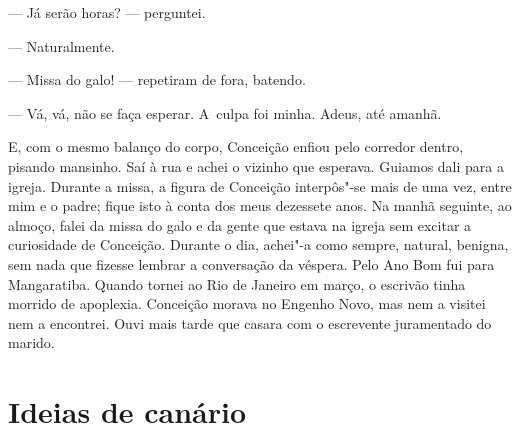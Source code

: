 \begin{linenumbers}
--- Já serão horas? --- perguntei.

--- Naturalmente.

--- Missa do galo! --- repetiram de fora, batendo.

--- Vá, vá, não se faça esperar. A~culpa foi minha. Adeus, até amanhã.

E, com o mesmo balanço do corpo, Conceição enfiou pelo corredor dentro,
pisando mansinho. Saí à rua e achei o vizinho que esperava. Guiamos dali
para a igreja. Durante a missa, a figura de Conceição interpôs"-se mais
de uma vez, entre mim e o padre; fique isto à conta dos meus dezessete
anos. Na manhã seguinte, ao almoço, falei da missa do galo e da gente
que estava na igreja sem excitar a curiosidade de Conceição. Durante o
dia, achei"-a como sempre, natural, benigna, sem nada que fizesse lembrar
a conversação da véspera. Pelo Ano Bom fui para Mangaratiba. Quando
tornei ao Rio de Janeiro em março, o escrivão tinha morrido de
apoplexia. Conceição morava no Engenho Novo, mas nem a visitei nem a
encontrei. Ouvi mais tarde que casara com o escrevente juramentado do
marido.

\end{linenumbers}

\chapter{Ideias de canário}


